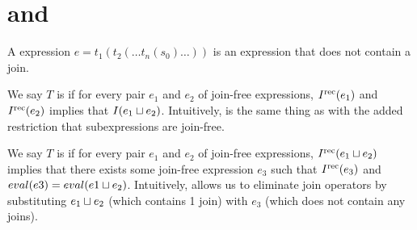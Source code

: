 \section{\dIconfluence{} and \dIreduction{}}
A  expression $e = t_1(t_2(\ldots t_n(s_0) \ldots))$ is an
expression that does not contain a join.

We say $T$ is  if for every pair $e_1$ and $e_2$ of
join-free expressions, $I^{\text{rec}}(e_1)$ and $I^{\text{rec}}(e_2)$ implies that $I(e_1 \sqcup
e_2)$. Intuitively, \dIconfluence{} is the same thing as \Iconfluence{} with
the added restriction that subexpressions are join-free.

We say $T$ is  if for every pair $e_1$ and $e_2$ of
join-free expressions, $I^{\text{rec}}(e_1 \sqcup e_2)$ implies that there exists some join-free expression $e_3$ such that $I^{\text{rec}}(e_3)$ and $eval(e3) = eval(e1 \sqcup
e_2)$.  Intuitively, \dIreduction{} allows us to eliminate join operators by
substituting $e_1 \sqcup e_2$ (which contains 1 join) with $e_3$ (which does not
contain any joins).

% 
%

